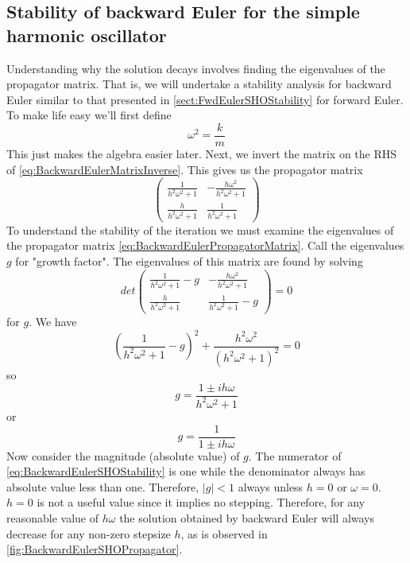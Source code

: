 \documentclass[hidelinks,notitlepage]{book}
\begin{document}
\subsection{Stability of backward Euler for the simple harmonic oscillator}
Understanding why the solution decays involves finding the eigenvalues of the propagator matrix.  That is, we will undertake a stability analysis for backward Euler similar to that presented in \cref{sect:FwdEulerSHOStability} for forward Euler.
To make life easy we'll first define
\begin{equation}
\label{eq:BackwardEulerPropagatorMatrix}
\omega^2 = \frac{k}{m}
\end{equation}
This just makes the algebra easier later.  Next, we invert the matrix on the RHS of \cref{eq:BackwardEulerMatrixInverse}.  This gives us the propagator matrix
\begin{equation}
\nonumber
\begin{pmatrix}
\frac{1}{h^2 \omega^2 + 1} & - \frac{h \omega^2}{h^2 \omega^2 + 1} \\
\frac{h}{h^2 \omega^2 + 1} & \frac{1}{h^2 \omega^2 + 1}
\end{pmatrix}
\end{equation}
To understand the stability of the iteration we must examine the eigenvalues of the propagator matrix \cref{eq:BackwardEulerPropagatorMatrix}.  Call the eigenvalues $g$ for "growth factor".  The eigenvalues of this matrix are found by solving
\begin{equation}
\nonumber
det
\begin{pmatrix}
	\frac{1}{h^2 \omega^2 + 1} - g & - \frac{h \omega^2}{h^2 \omega^2 + 1} \\
	\frac{h}{h^2 \omega^2 + 1} & \frac{1}{h^2 \omega^2 + 1} -g
\end{pmatrix}
=0
\end{equation}
for $g$.  We have
\begin{equation}
\nonumber
\left(\frac{1}{h^2 \omega^2 + 1} - g \right)^2 + \frac{h^2 \omega^2}{(h^2 \omega^2 + 1)^2} = 0
\end{equation}
so
\begin{equation}
\nonumber
g = \frac{1 \pm i h \omega}{h^2 \omega^2 + 1} 
\end{equation}
or
\begin{equation}
\label{eq:BackwardEulerSHOStability}
g = \frac{1}{1 \pm i h \omega} 
\end{equation}
Now consider the magnitude (absolute value) of $g$.  The numerator of \cref{eq:BackwardEulerSHOStability} is one while the denominator always has absolute value less than one.  Therefore, $|g| < 1$ always unless $h=0$ or $\omega=0$.  $h=0$ is not a useful value since it implies no stepping.  Therefore, for any reasonable value of $h \omega$ the solution obtained by backward Euler will always decrease for any non-zero stepsize $h$, as is observed in \cref{fig:BackwardEulerSHOPropagator}.
\end{document}
